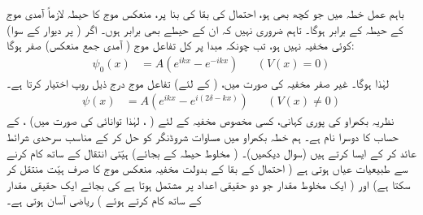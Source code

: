 باہم عمل خطہ  میں جو کچھ بھی ہو،  احتمال کی بقا کی بنا پر،  منعکس موج کا حیطہ لازماً آمدی موج کے حیطہ کے برابر ہوگا۔ تاہم ضروری نہیں کہ ان کے  حیطے بھی برابر ہوں۔   اگر  (  پر دیوار کے سوا)  کوئی مخفیہ نہیں  ہو،  تب چونکہ مبدا پر  کل تفاعل موج ( آمدی جمع منعکس) صفر ہوگا: 
\begin{align}
	\psi_0(x)& = A\left(e^{ikx}-e^{-ikx}\right)&&(V(x)=0)
\end{align}
لہٰذا  ہوگا۔ غیر صفر مخفیہ کی صورت میں، (  کے لئے)  تفاعل موج درج ذیل روپ اختیار کرتا ہے۔
\begin{align}\label{مساوات_بکھراو_مخفیہ_غیر_صفر}
	\psi(x) &= A\left(e^{ikx}-e^{i(2\delta-kx)}\right)&&(V(x)\neq0)
\end{align}
نظریہ بکھراو کی پوری کہانی، کسی مخصوص مخفیہ کے لئے ( ،  لہٰذا توانائی  کی صورت میں) ،     کے حساب کا دوسرا نام ہے۔ ہم خطہ بکھراو  میں مساوات شروڈنگر کو حل کر کے مناسب سرحدی شرائط  عائد  کر کے ایسا کرتے ہیں (سوال   دیکھیں)۔ ( مخلوط حیطہ  کے بجائے)   ہیّتی انتقال کے ساتھ  کام کرنے  سے طبیعیات  عیاں ہوتی   ہے (  احتمال کے  بقا کے  بدولت  مخفیہ منعکس موج کا صرف ہیّت  منتقل  کر سکتا ہے) اور ( ایک مخلوط مقدار جو دو حقیقی اعداد پر مشتمل ہوتا ہے کی بجائے ایک حقیقی مقدار کے ساتھ کام کرتے ہوئے )  ریاضی آسان ہوتی ہے۔


